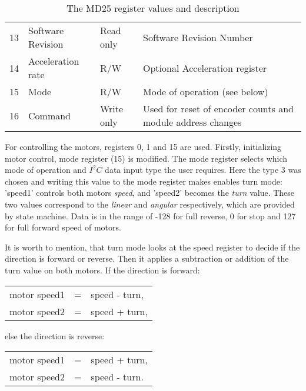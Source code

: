 \begin{table}[!h]
{\begin{tabular}{@{}llll@{}}
			13                & Software Revision & Read only           & Software Revision Number                                         \\
			14                & Acceleration rate & R/W                 & Optional Acceleration register                                   \\
			15                & Mode              & R/W                 & Mode of operation (see below)                                    \\
			16                & Command           & Write only          & Used for reset of encoder counts and module address changes      \\ \bottomrule
		\end{tabular}
	}	
	\caption{The MD25 register values and description}
	\label{table:md25}
\end{table}

\newpage
For controlling the motors, registers 0, 1 and 15 are used. Firstly, initializing motor control, mode register (15) is modified.
The mode register selects which mode of operation and $I^2C$ data input type the user requires. Here the type 3 was chosen and writing this value 
to the mode register makes enables turn mode: 'speed1' controls both motors \textit{speed}, and 'speed2' becomes the \textit{turn} value. 
These two values correspond to the \textit{linear} and \textit{angular} respectively, which are provided by state machine.
Data is in the range of -128 for full reverse, 0 for stop and 127 for full forward speed of motors.

It is worth to mention, that turn mode looks at the speed register to decide if the direction is forward or reverse. Then it applies a subtraction or addition of the turn value on both motors. If the direction is forward:
\begin{table}[!ht]
	\centering
	\begin{tabular}{lcl}
		motor speed1 & = & speed - turn,\\
		motor speed2 & = & speed + turn,
	\end{tabular}
\end{table}

else the direction is reverse:
\begin{table}[!ht]
	\centering
	\begin{tabular}{lcl}
		motor speed1 & = & speed + turn,\\
		motor speed2 & = & speed - turn.
	\end{tabular}
\end{table}


